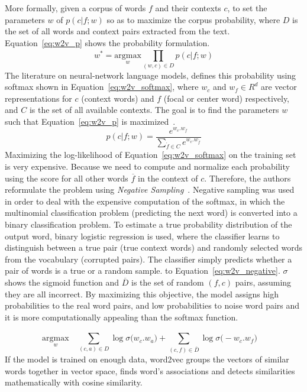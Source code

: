 More formally, given a corpus of words $f$ and their contexts $c$, to set the parameters $w$ of $p(c|f; w)$ so as to maximize the corpus probability, where $D$ is the set of all words and context pairs extracted from the text. Equation~\ref{eq:w2v_p} shows the probability formulation.
\begin{equation}
\label{eq:w2v_p}
w^*=\underset { w  }{ { \text{argmax} } } \prod _{ (w,c)\in D }^{  }{ p(c|f;  w )}
\end{equation}
The literature on neural-network language models, defines this probability using softmax shown in Equation~\ref{eq:w2v_softmax}, where $w_c$ and $ w_f\in R^d$ are vector representations for $c$ (context words) and $f$ (focal or center word) respectively, and
$C$ is the set of all available contexts. The goal is to find the parameters $w$ such that Equation~\ref{eq:w2v_p} is maximized~. 
\begin{equation}
\label{eq:w2v_softmax}
p(c|f;w)=\frac { { e }^{ w_{ c }.w_{ f } } }{ \sum _{ \acute { f } \in C }^{  }{ { e }^{ w_{ c }.w_{ \overline { f }  } } }  } 
\end{equation}
Maximizing the log-likelihood of Equation~\ref{eq:w2v_softmax} on the training set is very expensive. Because we need to compute and normalize each probability using the score for all other words  $\overline { f }$ in the context of $c$. Therefore, the authors reformulate the problem using \emph{Negative Sampling}~. Negative sampling was used in order to deal with the expensive computation of the softmax, in which the multinomial classification problem (predicting the next word) is converted into a binary classification problem. To estimate a true probability distribution of the output word, binary logistic regression is used, where the classifier learns to distinguish between a true pair (true context words) and randomly selected words from the vocabulary (corrupted pairs). The classifier simply predicts whether a pair of words is a true or a random sample. to Equation~\ref{eq:w2v_negative}. $ \sigma$ shows the sigmoid function and $\overline{D}$ is the set of random $(f, c)$ pairs, assuming they are all incorrect. By maximizing this objective, the model assigns high probabilities to the real word pairs, and low probabilities to noise word pairs and it is more computationally appealing than the softmax function.

\begin{equation}
\label{eq:w2v_negative}
\underset { w }{ \mathrm{ argmax } } \quad \sum _{ (c,a)\in D }^{  }{ \log { \sigma ( } w_{ c }.w_{ a }) } +\sum _{ (c,f)\in \overline { D }  }^{  }{ \log { \sigma ( } -w_{ c }.w_{ f })\quad  } 
\end{equation}
If the model is trained on enough data, word2vec groups the vectors of similar words together in vector space, finds word’s associations and detects similarities mathematically with cosine similarity. 
